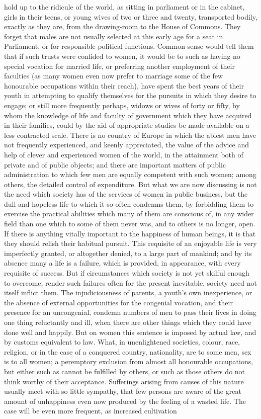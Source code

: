 \documentclass[12pt]{report}
\begin{document}
hold up to the ridicule of the world, as sitting in parliament or in the cabinet, girls in their teens, or young wives of two or three and twenty, transported bodily, exactly as they are, from the drawing-room to the House of Commons. They forget that males are not usually selected at this early age for a seat in Parliament, or for responsible political functions. Common sense would tell them that if such trusts were confided to women, it would be to such as having no special vocation for married life, or preferring another employment of their faculties (as many women even now prefer to marriage some of the few honourable occupations within their reach), have spent the best years of their youth in attempting to qualify themselves for the pursuits in which they desire to engage; or still more frequently perhaps, widows or wives of forty or fifty, by whom the knowledge of life and faculty of government which they have acquired in their families, could by the aid of appropriate studies be made available on a less contracted scale. There is no country of Europe in which the ablest men have not frequently experienced, and keenly appreciated, the value of the advice and help of clever and experienced women of the world, in the attainment both of private and of public objects; and there are important matters of public administration to which few men are equally competent with such women; among others, the detailed control of expenditure. But what we are now discussing is not the need which society has of the services of women in public business, but the dull and hopeless life to which it so often condemns them, by forbidding them to exercise the practical abilities which many of them are conscious of, in any wider field than one which to some of them never was, and to others is no longer, open. If there is anything vitally important to the happiness of human beings, it is that they should relish their habitual pursuit. This requisite of an enjoyable life is very imperfectly granted, or altogether denied, to a large part of mankind; and by its absence many a life is a failure, which is provided, in appearance, with every requisite of success. But if circumstances which society is not yet skilful enough to overcome, render such failures often for the present inevitable, society need not itself inflict them. The injudiciousness of parents, a youth's own inexperience, or the absence of external opportunities for the congenial vocation, and their presence for an uncongenial, condemn numbers of men to pass their lives in doing one thing reluctantly and ill, when there are other things which they could have done well and happily. But on women this sentence is imposed by actual law, and by customs equivalent to law. What, in unenlightened societies, colour, race, religion, or in the case of a conquered country, nationality, are to some men, sex is to all women; a peremptory exclusion from almost all honourable occupations, but either such as cannot be fulfilled by others, or such as those others do not think worthy of their acceptance. Sufferings arising from causes of this nature usually meet with so little sympathy, that few persons are aware of the great amount of unhappiness even now produced by the feeling of a wasted life. The case will be even more frequent, as increased cultivation 
\end{document}
